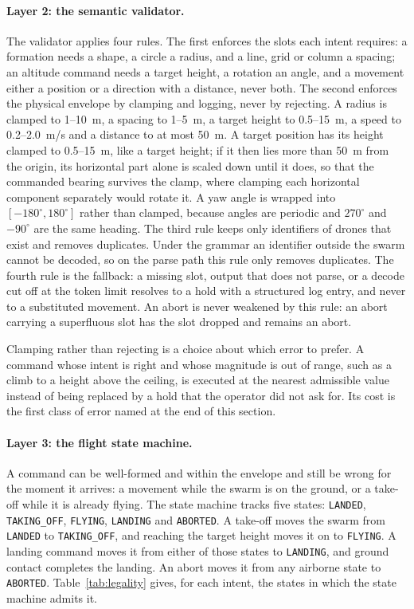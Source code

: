 \paragraph{Layer 2: the semantic validator.} The validator applies four rules. The first
enforces the slots each intent requires: a formation needs a shape, a circle a radius, and a line,
grid or column a spacing; an altitude command needs a target height, a rotation an angle, and a
movement either a position or a direction with a distance, never both. The second enforces the
physical envelope by clamping and logging, never by rejecting. A radius is clamped to 1--10~m, a
spacing to 1--5~m, a target height to 0.5--15~m, a speed to 0.2--2.0~m/s and a distance to at
most 50~m. A target position has its height clamped to 0.5--15~m, like a target height; if it
then lies more than 50~m from the origin, its horizontal part alone is scaled down until it does,
so that the commanded bearing survives the clamp, where clamping each horizontal component
separately would rotate it. A yaw angle is wrapped into $[-180^\circ, 180^\circ]$ rather than clamped, because
angles are periodic and $270^\circ$ and $-90^\circ$ are the same heading. The third rule keeps only
identifiers of drones that exist and removes duplicates. Under the grammar an identifier outside
the swarm cannot be decoded, so on the parse path this rule only removes duplicates. The fourth
rule is the fallback: a missing slot, output that does not parse, or a decode cut off at the token
limit resolves to a hold with a structured log entry, and never to a substituted movement.
An abort is never weakened by this rule: an abort carrying a superfluous slot has the slot dropped
and remains an abort.

Clamping rather than rejecting is a choice about which error to prefer. A command whose intent is
right and whose magnitude is out of range, such as a climb to a height above the ceiling, is
executed at the nearest admissible value instead of being replaced by a hold that the operator did
not ask for. Its cost is the first class of error named at the end of this section.

\paragraph{Layer 3: the flight state machine.} A command can be well-formed and within the
envelope and still be wrong for the moment it arrives: a movement while the swarm is on the
ground, or a take-off while it is already flying. The state machine tracks five states:
\texttt{LANDED}, \texttt{TAKING\_OFF}, \texttt{FLYING}, \texttt{LANDING} and \texttt{ABORTED}. A
take-off moves the swarm from \texttt{LANDED} to \texttt{TAKING\_OFF}, and reaching the target
height moves it on to \texttt{FLYING}. A landing command moves it from either of those states to
\texttt{LANDING}, and ground contact completes the landing. An abort moves it from any airborne
state to \texttt{ABORTED}. Table~\ref{tab:legality} gives, for each intent, the states in which the
state machine admits it.

